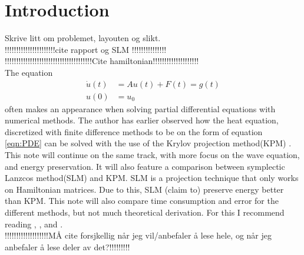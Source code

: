 \chapter{Introduction}
Skrive litt om problemet, layouten og slikt. \\
!!!!!!!!!!!!!!!!!!!!!!cite rapport og SLM !!!!!!!!!!!!!!!\\
!!!!!!!!!!!!!!!!!!!!!!!!!!!!!!!!!!!!!!Cite hamiltonian!!!!!!!!!!!!!!!!!!!!\\
The equation 
\begin{equation} 
\begin{aligned}
\dot{u}(t) &= A u(t) + F(t) = g(t) \\
u(0)&= u_0
\end{aligned}
\label{eqn:PDE}
\end{equation}
often makes an appearance when solving partial differential equations with numerical methods. The author has earlier observed how the heat equation, discretized with finite difference methods to be on the form of equation \eqref{eqn:PDE} can be solved with the use of the Krylov projection method(KPM) \cite{min}. This note will continue on the same track, with more focus on the wave equation, and energy preservation. It will also feature a comparison between symplectic Lanzcos method(SLM) \cite{SLM} and KPM. SLM is a projection technique that only works on Hamiltonian matrices. Due to this, SLM (claim to) preserve energy better than KPM. This note will also compare time consumption and error for the different methods, but not much theoretical derivation. For this I recommend reading \cite{elena}, \cite{min}, and \cite{luli}. \\

!!!!!!!!!!!!!!!!!!!MÅ cite forsjkellig når jeg vil/anbefaler å lese hele, og når jeg anbefaler å lese deler av det?!!!!!!!!!\\
